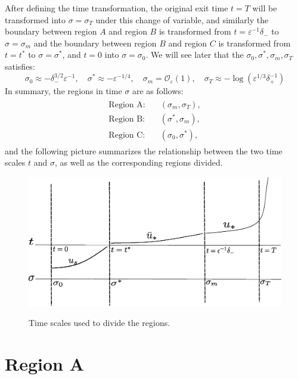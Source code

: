 \documentclass[letterpaper,11pt]{article}
\newcommand{\rmO}{\mathcal{O}}
\newcommand{\eps}{\varepsilon}
\numberwithin{equation}{section}
\theoremstyle{plain}
\begin{document}
After defining the time transformation, the original exit time $t=T$ will be transformed into $\sigma=\sigma_T$ under this change of variable, and similarly the boundary between region $A$ and region $B$ is  transformed from $t=\eps^{-1}\delta_-$ to $\sigma = \sigma_m$ and the boundary between region $B$ and region $C$ is  transformed from $t=t^*$ to $\sigma = \sigma^*$, and $t=0$ into $\sigma = \sigma_0$. We will see later that the $\sigma_0, \sigma^*, \sigma_m, \sigma_T$ satisfies:
\[
\sigma _0 \approx -\delta_-^{3/2}\eps^{-1}, \quad \sigma ^* \approx -\eps^{-1/4}, \quad \sigma_m = \rmO_\eps(1), \quad
\sigma_T \approx -\log(\eps^{1/3}\delta_+^{-1}) 
\]
In summary, the regions in time $\sigma$ are as follows:
\begin{align}\label{region_division_sig}
\begin{split}
\text{Region A:} & \quad (\sigma_m ,\sigma_T ),  \\
\text{Region B:} & \quad (\sigma^*, \sigma_m),  \\
\text{Region C:} & \quad (\sigma_0, \sigma^*),
\end{split}
\end{align}
and the following picture summarizes the relationship between the two time scales $t$ and $\sigma$, as well as the corresponding regions divided. 

\begin{figure}[ht]
 \centering %
 \scalebox{0.6} %
 {\includegraphics[angle = 0, origin = c]{pictures/time_scale.eps}} %
 \caption{Time scales used to divide the regions.}
\end{figure}\label{fig:time_scale} 


\section{Region A}\label{sec_A}
\end{document}
